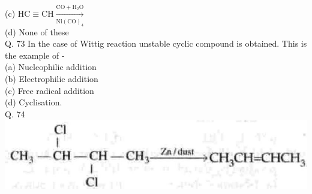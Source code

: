 \documentclass[10pt]{article}
\begin{document}
(c) $\mathrm{HC} \equiv \mathrm{CH} \xrightarrow[\mathrm{Ni}(\mathrm{CO})_{4}]{\mathrm{CO}+\mathrm{H}_{2} \mathrm{O}}$\\
(d) None of these\\
Q. 73 In the case of Wittig reaction unstable cyclic compound is obtained. This is the example of -\\
(a) Nucleophilic addition\\
(b) Electrophilic addition\\
(c) Free radical addition\\
(d) Cyclisation.\\
Q. 74\\
\includegraphics[max width=\textwidth, center]{2025_01_28_8470952b98110cec3aabg-234(2)}
\end{document}
